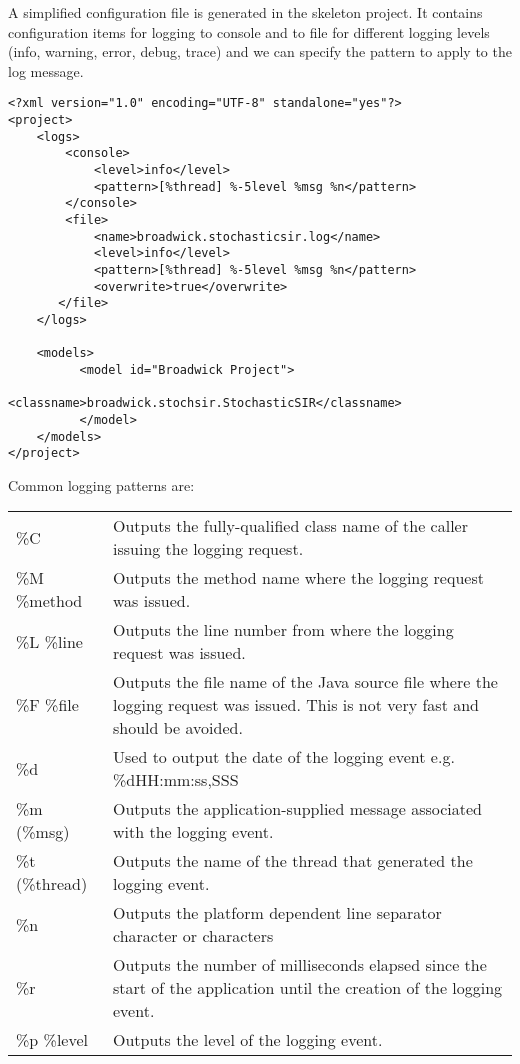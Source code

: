 A simplified configuration file is generated in the skeleton project. It contains configuration items for logging to console and to file for different logging levels (info, warning, error, debug, trace) and we can specify the pattern to apply to the log message.

\begin{sourcecode}
    \begin{verbatim}
<?xml version="1.0" encoding="UTF-8" standalone="yes"?>
<project>
    <logs>
        <console>
            <level>info</level>
            <pattern>[%thread] %-5level %msg %n</pattern>
        </console>
        <file>
            <name>broadwick.stochasticsir.log</name>
            <level>info</level>
            <pattern>[%thread] %-5level %msg %n</pattern>
            <overwrite>true</overwrite>
       </file>
    </logs>

    <models>
          <model id="Broadwick Project">
                 <classname>broadwick.stochsir.StochasticSIR</classname>
          </model>
    </models>
</project>
\end{verbatim}
\end{sourcecode}

Common logging patterns are:

\begin{tabulary}{1.0\textwidth}{l p{10cm}}
\toprule
\%C             & Outputs the fully-qualified class name of the caller issuing the logging request. \\
\%M  {\%method} & Outputs the method name where the logging request was issued. \\
\%L  {\%line}   & Outputs the line number from where the logging request was issued. \\
\%F  {\%file}   & Outputs the file name of the Java source file where the logging request was issued. This is not very fast and should be avoided. \\
\%d & Used to output the date of the logging event e.g. \%d{HH:mm:ss,SSS}  \\
\%m  (\%msg)    & Outputs the application-supplied message associated with the logging event. \\
\%t  (\%thread) & Outputs the name of the thread that generated the logging event. \\
\%n & Outputs the platform dependent line separator character or characters \\
\%r & Outputs the number of milliseconds elapsed since the start of the application until the creation of the logging event. \\
\%p  {\%level}  & Outputs the level of the logging event. \\
\bottomrule
\end{tabulary}


